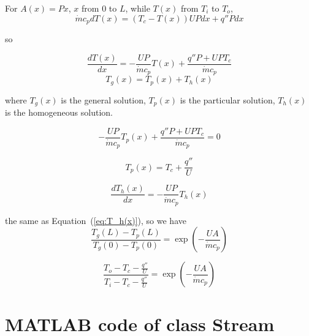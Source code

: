 For $A(x)=Px$, $x$ from $0$ to $L$, while $T(x)$ from $T_{i}$ to $T_{o}$,
\begin{equation}
\dot{m}c_{p}dT(x)=(T_{c}-T(x))UPdx+q''Pdx
\end{equation}

so

\begin{equation}
\frac{dT(x)}{dx}=-\frac{UP}{\dot{m}c_{p}}T(x)+\frac{q''P+UPT_{c}}{\dot{m}c_{p}}
\end{equation}
\begin{equation}
T_{g}(x)=T_{p}(x)+T_{h}(x)
\end{equation}

where $T_{g}(x)$ is the general solution, $T_{p}(x)$ is the particular
solution, $T_{h}(x)$ is the homogeneous solution.

\begin{equation}
-\frac{UP}{\dot{m}c_{p}}T_{p}(x)+\frac{q''P+UPT_{c}}{\dot{m}c_{p}}=0
\end{equation}

\begin{equation}
T_{p}(x)=T_{c}+\frac{q''}{U}
\end{equation}

\begin{equation}
\frac{dT_{h}(x)}{dx}=-\frac{UP}{\dot{m}c_{p}}T_{h}(x)
\end{equation}

the same as Equation~(\ref{eq:T_h(x)}), so we have
\begin{equation}
\frac{T_{g}(L)-T_{p}(L)}{T_{g}(0)-T_{p}(0)}=\exp(-\frac{UA}{\dot{m}c_{p}})
\end{equation}

\begin{equation}
\frac{T_{o}-T_{c}-\frac{q''}{U}}{T_{i}-T_{c}-\frac{q''}{U}}=\exp(-\frac{UA}{\dot{m}c_{p}})
\end{equation}

\chapter{MATLAB code of class Stream}
\label{cha:MATLAB_SOURCECODE}


